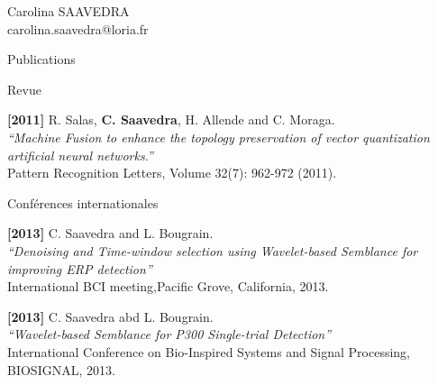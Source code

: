 \documentclass[letterpaper]{article}
\begin{document}
\begin{cv}{{\huge Carolina SAAVEDRA}\\
carolina.saavedra@loria.fr}


\begin{cvlist}{Publications}

\item[Revue]

\textbf{[2011]} R. Salas, \textbf{C. Saavedra}, H. Allende and C. Moraga.\\
{\it ``Machine Fusion to enhance the topology preservation of vector quantization artificial neural networks.''}\\
Pattern Recognition Letters, Volume 32(7): 962-972 (2011).

\item[Conférences internationales]

\textbf{[2013]} C. Saavedra and L. Bougrain.\\
{\it ``Denoising and Time-window selection using Wavelet-based Semblance for improving ERP
detection''}\\
International BCI meeting,Pacific Grove, California, 2013.

\textbf{[2013]} C. Saavedra abd L. Bougrain.\\
{\it ``Wavelet-based Semblance for P300 Single-trial Detection''}\\
International Conference on Bio-Inspired Systems and Signal Processing, BIOSIGNAL, 2013.


\end{cvlist}
\end{cv}
\end{document}
